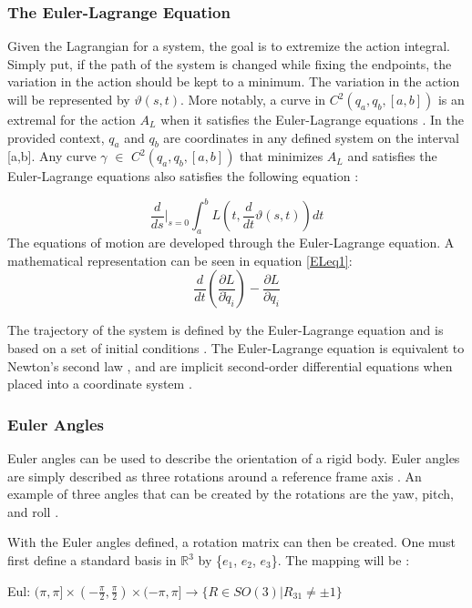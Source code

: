 \subsubsection{The Euler-Lagrange Equation}
Given the Lagrangian for a system, the goal is to extremize the action integral. 
Simply put, if the path of the system is changed while fixing the endpoints, the variation in the action should be kept to a minimum. 
The variation in the action will be represented by $\vartheta(s,t)$. 
More notably, a curve in $C^2(q_a,q_b,[a,b])$ is an extremal for the action $A_L$ when it satisfies the Euler-Lagrange equations \cite{Lewis}. 
In the provided context, $q_a$ and $q_b$ are coordinates in any defined system on the interval [a,b]. 
Any curve $\gamma$ $\in$ $C^2(q_a,q_b,[a,b])$ that minimizes $A_L$ and satisfies the Euler-Lagrange equations also satisfies the following equation \cite{Lewis}:

\begin{equation} \label{ELeq1}
\frac{d}{ds}\Big|_{s=0}\int_a^b L(t,\frac{d}{dt}\vartheta (s,t))dt
\end{equation}
The equations of motion are developed through the Euler-Lagrange equation. A mathematical representation can be seen in equation \ref{ELeq1}:
\begin{equation}
\frac{d}{dt}(\frac{\partial L}{\partial \dot{q}_{{i}}})-\frac{\partial L}{\partial q_{i}}
\end{equation}

The trajectory of the system is defined by the Euler-Lagrange equation and is based on a set of initial conditions \cite{NonholonomicPowerpoint}. 
The Euler-Lagrange equation is equivalent to Newton's second law \cite{NonholonomicPowerpoint}, and are implicit second-order differential equations when placed into a coordinate system \cite{Lewis}.
\subsubsection{Euler Angles}
Euler angles can be used to describe the orientation of a rigid body. Euler angles are simply described as three rotations around a reference frame axis \cite{EulerAnglesPowerpoint}. 
An example of three angles that can be created by the rotations are the yaw, pitch, and roll \cite{EulerAnglesPowerpoint}.
\par
With the Euler angles defined, a rotation matrix can then be created.  One must first define a standard basis in $\mathbb{R}^3$ by \{$e_1$, $e_2$, $e_3$\}. The mapping will be \cite{Lewis}:
\par
\begin{center}
\par
Eul: $(\pi,\pi]\times(-\frac{\pi}{2},\frac{\pi}{2})\times(-\pi,\pi] \rightarrow \{R\in SO(3)| R_{31}\neq \pm 1\}$
\end{center}
\par

